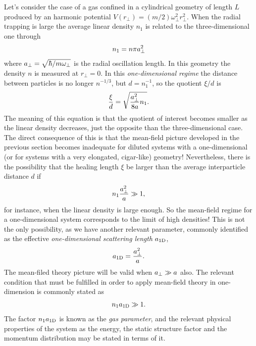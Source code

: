 Let's consider the case of a gas confined in a cylindrical geometry of length
$L$ produced by an harmonic potential $V(r_{\bot}) = (m/2)\omega^2_{\bot}
  r^2_\bot$. When the radial trapping is  large the average linear density $n_1$
is related to the three-dimensional one through
%
\begin{equation}
  n_1 = n \pi a^2_\bot
\end{equation}
%
where $a_\bot = \sqrt{\hbar / m \omega_\bot}$ is the radial oscillation
length. In this geometry the density $n$ is measured at $r_\bot = 0$. In this
\emph{one-dimensional regime} the distance between particles is no longer
$n^{-1/3}$, but $d = n_1^{-1}$, so the quotient $\xi / d$ is
%
\begin{equation}
  \label{eq:mean-field-one-dim-quotient}
  \frac{\xi}{d} = \sqrt{\frac{a^2_\bot}{8a} n_1}.
\end{equation}
%
The meaning of this equation is that the quotient of interest becomes smaller as
the linear density decreases, just the opposite than the three-dimensional case.
The direct consequence of this is that the mean-field picture developed in the
previous section becomes inadequate for diluted systems with a one-dimensional
(or for systems with a very elongated, cigar-like) geometry!
%
Nevertheless, there is the possibility that the healing length $\xi$ be larger
than the average interparticle distance $d$ if
%
\begin{equation}
  n_1 \frac{a^2_{\bot}}{a} \gg 1,
\end{equation}
%
for instance, when the linear density is large enough. So the mean-field regime
for a one-dimensional system corresponds to the limit of high densities! This is
not the only possibility, as we have another relevant parameter, commonly
identified as the effective \textit{one-dimensional scattering length}
$a_{\mathrm{1D}}$,
%
\begin{equation}
  \label{eq:one-dim-scattering-length}
  a_{\mathrm{1D}} = \frac{a^2_{\bot}}{a}.
\end{equation}
%
The mean-filed theory picture will be valid when $a_{\bot} \gg a$ also. The
relevant condition that must be fulfilled in order to apply mean-field theory in
one-dimension is commonly stated as
%
\begin{equation}
  n_1 a_\mathrm{1D} \gg 1.
\end{equation}
%
The factor $n_1 a_\mathrm{1D}$ is known as the \emph{gas parameter}, and the
relevant physical properties of the system as the energy, the static structure
factor and the momentum distribution may be stated in terms of it.


